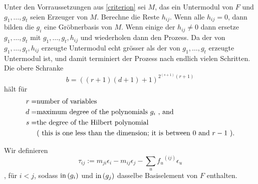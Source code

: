 \documentclass{article}
\begin{document}
\begin{algo}
	Unter den Vorraussetzungen aus \ref{criterion} 
	sei
	\( M \),
	das ein Untermodul von
	\( F \)
	und 
	\( g_{1},\dots,g_{t}\)
	seien  Erzeuger von 
	\( M \).
	Berechne die Reste
	\( h_{ij} \).
	Wenn alle 
	\( h_{ij} = 0 \),
	dann bilden die 
	\(g_{i} \)
	eine Gr\"obnerbasis von 
	\( M \).
	Wenn einige der 
	\( h_{ij} \neq 0 \)
	dann ersetze 
	\( g_{1},\dots,g_{t}\)
	mit 
	\( g_{1},\dots,g_{t},h_{ij} \)
	und wiederholen dann den Prozess.
	Da der von
	\( g_{1},\dots,g_{t},h_{ij} \)
	erzeugte Untermodul echt gr\"osser als der von
	\( g_{1},\dots,g_{t}\)
	erzeugte Untermodul ist, 
	und damit terminiert der Prozess nach endlich vielen Schritten.
	Die obere Schranke 
	\[
		b=\left( 
			\left( r+1 \right)
			\left( d+1 \right)+1 
		\right)^{2^{(s+1)}(r+1) }
	\]	
	h\"alt f\"ur
	\begin{align*}	
		r = &\text{number of variables} \\
		d = &\text{maximum degree of the polynomials \( g_i\) , and } \\
		s = &\text{the degree of the Hilbert polynomial } \\
		    &\text{( this is one less than the dimension; it is between \( 0 \) and \(r-1\) ).}
	\end{align*}

\end{algo}
\begin{defn}
	Wir definieren
	\[
		\tau_{ij}:=
		m_{ji}\epsilon_{i} - 
		m_{ij} \epsilon_{j} - 
		\sum_{u} {f_{u}}^{\left( ij \right) } 
		\epsilon_{u} 
	\],
	f\"ur
	\( i < j \),
	sodass 
	\( \operatorname{in} \left( g_{i}  \right) \)
	und
	\( \operatorname{in} \left( g_{j}  \right) \)
	dasselbe Basiselement von \( F \)
	enthalten.
\end{defn}
\end{document}
